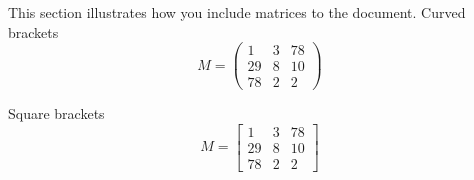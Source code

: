 \documentclass{article}
\begin{document}
	This section illustrates how you include matrices to the document.
	Curved brackets
	\[
	 M = \begin{pmatrix}
	 1 & 3 & 78 \\
	 29 & 8 & 10 \\
	 78 & 2 & 2 
	 \end{pmatrix}
	\]
	
	Square brackets
	\[
	M = \begin{bmatrix}
	1 & 3 & 78 \\
	29 & 8 & 10 \\
	78 & 2 & 2 
	\end{bmatrix}
	\]
	
	
\end{document}
